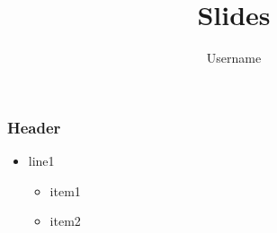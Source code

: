 \documentclass[14pt,t]{beamer}
\title{Slides}
\author{Username}
\begin{document}
\begin{frame}
\frametitle{Header}
\begin{itemize}
\item line1
\begin{itemize}
\item item1
\item item2
\end{itemize}
\end{itemize}
\end{frame}
\end{document}
